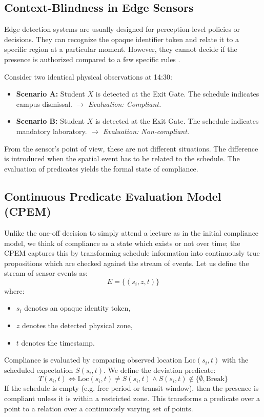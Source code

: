 \documentclass[conference]{IEEEtran}
\begin{document}
\subsection{Context-Blindness in Edge Sensors}
Edge detection systems are usually designed for perception-level policies or decisions. They can recognize the opaque identifier token and relate it to a specific region at a particular moment. However, they cannot decide if the presence is authorized compared to a few specific rules \cite{b5}.

Consider two identical physical observations at 14:30:
\begin{itemize}
    \item \textbf{Scenario A:} Student $X$ is detected at the Exit Gate. The schedule indicates campus dismissal. $\rightarrow$ \textit{Evaluation: Compliant.}
    \item \textbf{Scenario B:} Student $X$ is detected at the Exit Gate. The schedule indicates mandatory laboratory. $\rightarrow$ \textit{Evaluation: Non-compliant.}
\end{itemize}

From the sensor's point of view, these are not different situations. The difference is introduced when the spatial event has to be related to the schedule. The evaluation of predicates yields the formal state of compliance.

\subsection{Continuous Predicate Evaluation Model (CPEM)}
Unlike the one-off decision to simply attend a lecture as in the initial compliance model, we think of compliance as a state which exists or not over time; the CPEM captures this by transforming schedule information into continuously true propositions which are checked against the stream of events. Let us define the stream of sensor events as:
\begin{equation}
E = \{(s_i, z, t)\}
\end{equation}
where:
\begin{itemize}
    \item $s_i$ denotes an opaque identity token,
    \item $z$ denotes the detected physical zone,
    \item $t$ denotes the timestamp.
\end{itemize}
Compliance is evaluated by comparing observed location $\text{Loc}(s_i, t)$ with the scheduled expectation $S(s_i, t)$. We define the deviation predicate:
\begin{equation}
T(s_i, t) \iff \text{Loc}(s_i, t) \neq S(s_i, t) \land S(s_i, t) \notin \{\emptyset, \text{Break}\}
\end{equation}
If the schedule is empty (e.g. free period or transit window), then the presence is compliant unless it is within a restricted zone. This transforms a predicate over a point to a relation over a continuously varying set of points.
\end{document}
